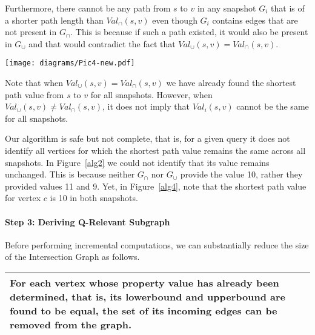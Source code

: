 Furthermore, there cannot be any path from $s$ to $v$ in any snapshot $G_i$ that is of a shorter path length than $Val_\cap(s,v)$ even though $G_i$ contains edges that are not present in $G_\cap$. This is because if such a path existed, it would also be present in $G_\cup$ and that would contradict the fact that $Val_\cup(s,v) = Val_\cap(s,v)$.


\begin{figure*}[!t]
    \centering
    \texttt{[image: diagrams/Pic4-new.pdf]}
    \vspace{-0.15in}
    \caption{Carrying out incremental computations via edge additions to obtain final query results for each snapshot. Note that for vertex $c$, the final query result is the same (10) for both snapshots while its lower and upper bounds were 9 and 11.}
    \label{alg4}
    \vspace{-0.15in}
\end{figure*}

\vspace{0.05in}
Note that when $Val_\cup(s,v) = Val_\cap(s,v)$ we have already found the shortest path value from $s$ to $v$ for all snapshots. However, when $Val_\cup(s,v) \neq Val_\cap(s,v)$, it does not imply that $Val_i(s,v)$ cannot be the same for all snapshots. 

Our algorithm is safe but not complete, that is, for a given query it does not identify all vertices for which the shortest path value remains the same across all snapshots.
In Figure~\ref{alg2} we could not identify that its value remains unchanged. This is because neither $G_{\cap}$ nor $G_{\cup}$ provide the value 10, rather they provided values 11 and 9. Yet, in Figure~\ref{alg4}, note that the shortest path value for vertex $c$ is 10 in both snapshots. 




\vspace{-0.05in}
\paragraph{Step 3: Deriving Q-Relevant Subgraph} Before performing incremental computations, we can substantially reduce the size of the Intersection Graph as follows. 

\vspace{0.075in}
\begin{tabular} {|p{7.5cm}|} \hline
\textsf{For each vertex whose property value has already
been determined, that is, its lowerbound and upperbound are found to be equal, the set of its incoming edges can be removed from the graph.} \\ \hline
\end{tabular}

